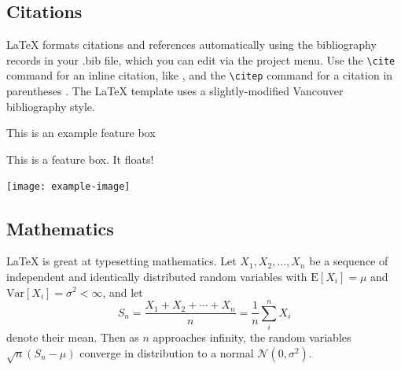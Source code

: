 \documentclass[9pt]{livecoms}
\begin{document}
\subsection{Citations}

LaTeX formats citations and references automatically using the bibliography records in your .bib file, which you can edit via the project menu. Use the \verb|\cite| command for an inline citation, like \cite{Aivazian917}, and the \verb|\citep| command for a citation in parentheses \citep{Aivazian917}. The LaTeX template uses a slightly-modified Vancouver bibliography style. 

\begin{featurebox}
\caption{This is an example feature box}
\label{box:simple}
This is a feature box. It floats!
\medskip

\texttt{[image: example-image]}

\lipsum[1]
\end{featurebox}

\subsection{Mathematics}

\LaTeX{} is great at typesetting mathematics. Let $X_1, X_2, \ldots, X_n$ be a sequence of independent and identically distributed random variables with $\text{E}[X_i] = \mu$ and $\text{Var}[X_i] = \sigma^2 < \infty$, and let
\begin{equation}
\label{eq:CLT}
S_n = \frac{X_1 + X_2 + \cdots + X_n}{n}
      = \frac{1}{n}\sum_{i}^{n} X_i
\end{equation}
denote their mean. Then as $n$ approaches infinity, the random variables $\sqrt{n}(S_n - \mu)$ converge in distribution to a normal $\mathcal{N}(0, \sigma^2)$.

\lipsum[3]
\end{document}
